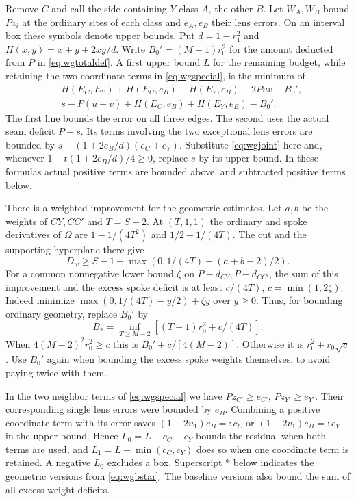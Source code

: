 \documentclass[11pt,a4paper]{article}
\theoremstyle{definition}
\begin{document}
Remove $C$ and call the side containing $Y$ class $A$, the other $B$.
Let $W_A,W_B$ bound $Pz_i$ at the ordinary sites of each class
and $e_A,e_B$ their lens errors. On an interval box these symbols
denote upper bounds. Put $d=1-r_1^2$ and
$H(x,y)=x+y+2xy/d$. Write $B_0'=(M-1)r_0^2$ for the amount
deducted from $P$ in \eqref{eq:wgtotaldef}. A first upper bound
$L$ for the remaining budget, while retaining the two
coordinate terms in \eqref{eq:wgspecial}, is the minimum of
\begin{align*}
 &H(E_C,E_Y)+H(E_C,e_B)+H(E_Y,e_B)-2Puv-B_0',\\
 &s-P(u+v)+H(E_C,e_B)+H(E_Y,e_B)-B_0'.
\end{align*}
The first line bounds the error on all three edges. The second uses
the actual seam deficit $P-s$. Its terms involving the two exceptional
lens errors are bounded by $s+(1+2e_B/d)(e_C+e_Y)$. Substitute
\eqref{eq:wgjoint} here and, whenever $1-t(1+2e_B/d)/4\ge0$,
replace $s$ by its upper bound. In these formulas actual positive
terms are bounded above, and subtracted positive terms below.

There is a weighted improvement for the geometric estimates.
Let $a,b$ be the weights of $CY,CC'$ and $T=S-2$. At $(T,1,1)$ the
ordinary and spoke derivatives of $\Omega$ are
$1-1/(4T^2)$ and $1/2+1/(4T)$. The cut and the supporting
hyperplane there give
\[
 D_w\ge S-1+\max(0,1/(4T)-(a+b-2)/2).
\]
For a common nonnegative lower bound $\zeta$ on $P-d_{CY},P-d_{CC'}$,
the sum of this improvement and the excess spoke deficit is at least
$c/(4T)$, $c=\min(1,2\zeta)$. Indeed minimize
$\max(0,1/(4T)-y/2)+\zeta y$ over $y\ge0$. Thus, for bounding
ordinary geometry, replace $B_0'$ by
\begin{equation}
 B_* = \inf_{T\ge M-2}[(T+1)r_0^2+c/(4T)] .
 \label{eq:wgbstar}
\end{equation}
When $4(M-2)^2r_0^2\ge c$ this is $B_0'+c/[4(M-2)]$. Otherwise
it is $r_0^2+r_0\sqrt c$. Use $B_0'$ again when bounding the
excess spoke weights themselves, to avoid paying twice with them.

In the two neighbor terms of \eqref{eq:wgspecial} we have
$Pz_{C'}\ge e_{C'}$, $Pz_{Y'}\ge e_{Y'}$. Their corresponding single
lens errors were bounded by $e_B$. Combining a positive coordinate
term with its error saves $(1-2u_1)e_B=:c_C$ or $(1-2v_1)e_B=:c_Y$
in the upper bound. Hence $L_0=L-c_C-c_Y$ bounds the residual
when both terms are used, and $L_1=L-\min(c_C,c_Y)$ does so when
one coordinate term is retained. A negative $L_0$ excludes a box.
Superscript $*$ below indicates the geometric versions from
\eqref{eq:wgbstar}. The baseline versions also bound the
sum of all excess weight deficits.
\end{document}
